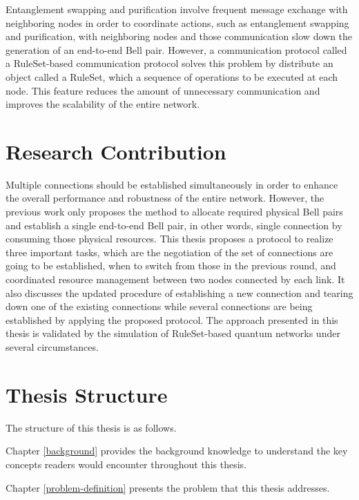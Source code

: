 Entanglement swapping and purification involve frequent message exchange with neighboring nodes in order to coordinate actions, such as entanglement swapping and purification, with neighboring nodes and those communication slow down the generation of an end-to-end Bell pair.
However, a communication protocol \cite{matsuo2019quantum} called a RuleSet-based communication protocol solves this problem by distribute an object called a RuleSet, which a sequence of operations to be executed at each node. This feature reduces the amount of unnecessary communication and improves the scalability of the entire network.

\section{Research Contribution}
\label{introduction:research-contribution}

Multiple connections should be established simultaneously in order to enhance the overall performance and robustness of the entire network. 
However, the previous work only proposes the method to allocate required physical Bell pairs and establish a single end-to-end Bell pair, in other words, single connection by consuming those physical resources.
This thesis proposes a protocol to realize three important tasks, which are the negotiation of the set of connections are going to be established, when to switch from those in the previous round, and coordinated resource management between two nodes connected by each link.
It also discusses the updated procedure of establishing a new connection and tearing down one of the existing connections while several connections are being established by applying the proposed protocol.
The approach presented in this thesis is validated by the simulation of RuleSet-based quantum networks under several circumstances.

\section{Thesis Structure}
\label{introduction:thesis-structure} 

The structure of this thesis is as follows. 

Chapter \ref{background} provides the background knowledge to understand the key concepts readers would encounter throughout this thesis.

Chapter \ref{problem-definition} presents the problem that this thesis addresses.

